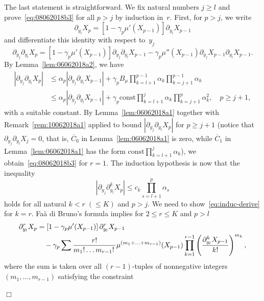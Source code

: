 \documentclass[bj]{imsart}
\newcommand{\proofendsign}{$\Box$}
\newenvironment{proof}{{\noindent \bf Proof }}
 {{\hspace*{\fill}\proofendsign\par\bigskip}}
\newcommand*{\const}{\mathrm{const}}
\newcommand*{\ol}{\overline}
\begin{document}
\begin{proof}
The last statement is straightforward.
We fix natural numbers $j\ge l$ and prove~\eqref{eq:08062018b3}
for all $p>j$ by induction in~$r$.
First, for $p>j$, we write
$$
\partial_{y_{l}}X_{p}
=\left[1-\gamma_{p}\mu'(X_{p-1})\right]\partial_{y_{l}}X_{p-1}
$$
and differentiate this identity with respect to~$y_j$
$$
\partial_{y_{j}}\partial_{y_{l}}X_{p}
=\left[1-\gamma_{p}\mu'(X_{p-1})\right]\partial_{y_{j}}\partial_{y_{l}}X_{p-1}-\gamma_{p}\mu''(X_{p-1})\partial_{y_{j}}X_{p-1}\partial_{y_{l}}X_{p-1}.
$$
By Lemma~\ref{lem:06062018a2}, we have
\begin{align*}
|\partial_{y_{j}}\partial_{y_{l}}X_{p}|
&\le\alpha_p|\partial_{y_{j}}\partial_{y_{l}}X_{p-1}|
+\gamma_{p}
B_\mu
\prod_{k=l+1}^{p-1}\alpha_k
\prod_{k=j+1}^{p-1}\alpha_k\\
&\le\alpha_p|\partial_{y_{j}}\partial_{y_{l}}X_{p-1}|
+\gamma_{p}
\const
\prod_{k=l+1}^{j}\alpha_k
\prod_{k=j+1}^{p}\alpha_k^2,
\quad p\ge j+1,
\end{align*}
with a suitable constant.
By Lemma~\ref{lem:06062018a1}
together with Remark~\ref{rem:10062018a1} applied
to bound $|\partial_{y_{j}}\partial_{y_{l}}X_{p}|$
for $p\ge j+1$
(notice that $\partial_{y_j}\partial_{y_l}X_j=0$, that is,
$\ol C_0$ in Lemma~\ref{lem:06062018a1} is zero,
while $\ol C_1$ in Lemma~\ref{lem:06062018a1}
has the form $\const\prod_{k=l+1}^j \alpha_k$),
we obtain~\eqref{eq:08062018b3} for $r=1$.
The induction hypothesis is now that the inequality
\begin{equation}\label{eq:induc-derive}
\left|\partial_{y_{j}}\partial_{y_{l}}^{k}X_{p}\right|
\leq c_{k}\prod_{s=l+1}^{p}\alpha_{s}
\end{equation}
holds for all natural $k<r\;(\le K)$ and $p>j$.
We need to show~\eqref{eq:induc-derive} for $k=r$.
Fa\`a di Bruno's formula implies for $2\le r\le K$ and $p>l$
\begin{align}
\partial_{y_{l}}^{r}X_{p}
&=\left[1-\gamma_{p}\mu'(X_{p-1})\right]\partial_{y_{l}}^{r}X_{p-1}
\label{eq:08062018a1}\\
&\hspace{1em}-\gamma_{p}\sum\frac{r!}{m_{1}!\ldots m_{r-1}!\,}\mu^{(m_{1}+\ldots+m_{r-1})}(X_{p-1})\prod_{k=1}^{r-1}\left(\frac{\partial_{y_{l}}^{k}X_{p-1}}{k!}\right)^{m_{k}},
\notag
\end{align}
where the sum is taken over all $(r-1)$-tuples of nonnegative integers
$(m_{1},\ldots,m_{r-1})$ satisfying the constraint
\begin{equation}\label{eq:09062018a1}

\end{equation}
\end{proof}
\end{document}
